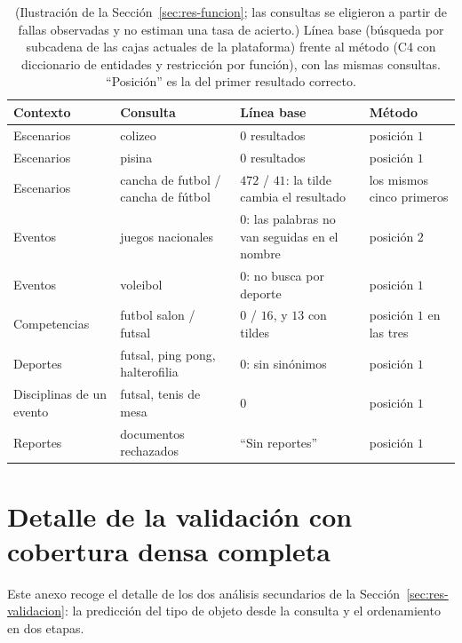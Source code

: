 \documentclass[11pt,letterpaper]{article}
\numberwithin{equation}{section}
\begin{document}
\begin{table}[!htbp]
\centering
\footnotesize
\setlength{\tabcolsep}{5pt}
\renewcommand{\arraystretch}{1.2}
\caption{(Ilustración de la Sección~\ref{sec:res-funcion}; las consultas se eligieron a partir de fallas observadas y no estiman una tasa de acierto.) Línea base (búsqueda por subcadena de las cajas actuales de la plataforma) frente al método (C4 con diccionario de entidades y restricción por función), con las mismas consultas. ``Posición'' es la del primer resultado correcto.}
\label{tab:cajas}
\begin{tabularx}{\textwidth}{@{}l l Y l@{}}
\toprule
\textbf{Contexto} & \textbf{Consulta} & \textbf{Línea base} & \textbf{Método} \\
\midrule
Escenarios & colizeo & $0$ resultados & posición $1$ \\
Escenarios & pisina & $0$ resultados & posición $1$ \\
Escenarios & cancha de futbol / cancha de fútbol & $472$ / $41$: la tilde cambia el resultado & los mismos cinco primeros \\
Eventos & juegos nacionales & $0$: las palabras no van seguidas en el nombre & posición $2$ \\
Eventos & voleibol & $0$: no busca por deporte & posición $1$ \\
Competencias & futbol salon / futsal & $0$ / $16$, y $13$ con tildes & posición $1$ en las tres \\
Deportes & futsal, ping pong, halterofilia & $0$: sin sinónimos & posición $1$ \\
Disciplinas de un evento & futsal, tenis de mesa & $0$ & posición $1$ \\
Reportes & documentos rechazados & ``Sin reportes'' & posición $1$ \\
\bottomrule
\end{tabularx}
\end{table}

\clearpage
\section{Detalle de la validación con cobertura densa completa}
\label{anx:validacion}
Este anexo recoge el detalle de los dos análisis secundarios de la Sección~\ref{sec:res-validacion}: la predicción del tipo de objeto desde la consulta y el ordenamiento en dos etapas.
\end{document}
